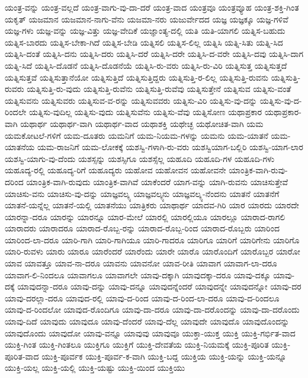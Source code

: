 {ಯಂತ್ರ-ವನ್ನು
ಯಂತ್ರ-ವಲ್ಲದೆ
ಯಂತ್ರ-ವಾಗು-ವು-ದಾ-ದರೆ
ಯಂತ್ರ-ವಾದ
ಯಂತ್ರವೂ
ಯಂತ್ರವ್ಯೂಹ
ಯಂತ್ರ-ಶಕ್ತಿ-ಗಿಂತ
ಯಕೃತ್
ಯಜಮಾನ
ಯಜಮಾನ-ನಾಗು-ವೆನು
ಯಜಮಾ-ನರು
ಯಜುರ್ವೇದದ
ಯಜ್ಞ
ಯಜ್ಞಕ್ಕೂ
ಯಜ್ಞ-ಗಳಿವೆ
ಯಜ್ಞ-ಗಳು
ಯಜ್ಞ-ವನ್ನು
ಯಜ್ಞ-ವಿತ್ತು
ಯಜ್ಞ-ವೇದಿಕೆ
ಯಜ್ಞಾಂತ್ಯ-ದಲ್ಲಿ
ಯತಿ
ಯತಿ-ಯಾಗಲಿ
ಯತ್ನಿಸ-ಬಹುದು
ಯತ್ನಿಸ-ಬಾರದು
ಯತ್ನಿಸ-ಬೇಕಾ-ಗಿದೆ
ಯತ್ನಿಸ-ಬೇಡಿ
ಯತ್ನಿಸಲಿ
ಯತ್ನಿಸ-ಲಿಲ್ಲ
ಯತ್ನಿಸಿ
ಯತ್ನಿ-ಸಿತು
ಯತ್ನಿ-ಸಿದ
ಯತ್ನಿಸಿ-ದಂತೆ
ಯತ್ನಿಸಿ-ದನು
ಯತ್ನಿಸಿ-ದರು
ಯತ್ನಿಸಿ-ದರೆ
ಯತ್ನಿಸಿ-ದರೇ
ಯತ್ನಿಸಿ-ದ-ವರೇ
ಯತ್ನಿಸಿ-ದವು
ಯತ್ನಿಸಿ-ದಾಗ
ಯತ್ನಿ-ಸಿದೆ
ಯತ್ನಿಸಿ-ದೊಡನೆ
ಯತ್ನಿಸಿ-ದೊಡನೆಯೆ
ಯತ್ನಿಸಿ-ರು-ವರು
ಯತ್ನಿಸಿ-ರು-ವಿರಿ
ಯತ್ನಿಸುತ್ತ
ಯತ್ನಿಸುತ್ತದೆ
ಯತ್ನಿಸುತ್ತವೆ
ಯತ್ನಿಸುತ್ತಾನೆಯೋ
ಯತ್ನಿಸುತ್ತಿದೆ
ಯತ್ನಿಸುತ್ತಿದ್ದರು
ಯತ್ನಿಸುತ್ತಿ-ರ-ಲಿಲ್ಲ
ಯತ್ನಿಸುತ್ತಿ-ರುವನು
ಯತ್ನಿಸುತ್ತಿ-ರುವರು
ಯತ್ನಿಸುತ್ತಿ-ರು-ವುದು
ಯತ್ನಿಸುತ್ತಿ-ರುವೆನು
ಯತ್ನಿಸುತ್ತಿ-ರುವೆವು
ಯತ್ನಿಸುತ್ತೇನೆ
ಯತ್ನಿಸುವ
ಯತ್ನಿಸು-ವಂತೆ
ಯತ್ನಿಸುವನು
ಯತ್ನಿಸುವರು
ಯತ್ನಿಸುವ-ವ-ರನ್ನು
ಯತ್ನಿಸುವವರು
ಯತ್ನಿಸು-ವಿರಿ
ಯತ್ನಿಸು-ವು-ದನ್ನು
ಯತ್ನಿಸು-ವು-ದ-ರಿಂದಲೇ
ಯತ್ನಿಸು-ವುದಿಲ್ಲ
ಯತ್ನಿಸು-ವುದು
ಯತ್ನಿಸುವೆನು
ಯತ್ನಿಸು-ವೆವು
ಯತ್ನಿಸೋಣ
ಯಥಾಪ್ರಕಾರ
ಯಥಾಪ್ರಕಾರ-ವಾಗಿ
ಯಥಾರ್ಥ
ಯಥಾರ್ಥ-ವಾಗಿ
ಯಥಾರ್ಥ-ವಾದ
ಯಥಾಶಕ್ತಿ
ಯಥೇಚ್ಛ
ಯಥೋಚಿತ-ವಾಗಿ
ಯಮ
ಯಮಕೋಟಲೆ-ಗಳಿಗೆ
ಯಮ-ದೂತರು
ಯಮನಿಗೆ
ಯಮ-ನಿಯಮ-ಗಳನ್ನು
ಯಮನು
ಯಮ-ಯಾತನೆ
ಯಮ-ಯಾತನೆಯ
ಯಮ-ರಾಜನಿಗೆ
ಯಮ-ಲೋಕಕ್ಕೆ
ಯಶಸ್ವಿ-ಗಳಾಗಿ-ರು-ವರು
ಯಶಸ್ವಿಯಾಗ-ಬಲ್ಲಿರಿ
ಯಶಸ್ವಿ-ಯಾಗ-ಲಾರ
ಯಶಸ್ವಿ-ಯಾಗು-ವು-ದೆಂದು
ಯಶಸ್ಸನ್ನು
ಯಶಸ್ಸಿಗೂ
ಯಶಸ್ಸೆಲ್ಲ
ಯಹೂದಿ
ಯಹೂದಿ-ಗಳ
ಯಹೂದಿ-ಗಳು
ಯಹೂದ್ಯ-ರಲ್ಲಿ
ಯಹೂದ್ಯ-ರಿಗೆ
ಯಹೂದ್ಯರು
ಯಹೋವ
ಯಹೋವನ
ಯಹೋವನೇ
ಯಾಂತ್ರಿಕ-ವಾಗಿ-ರುವು-ದರಿಂದ
ಯಾಂತ್ರಿಕ-ವಾಗಿ-ರುವುದು
ಯಾಂತ್ರಿಕ-ವಾಗಿವೆ
ಯಾಕೆಂದರೆ
ಯಾಗ-ವನ್ನು
ಯಾಗಿ-ರುವನು
ಯಾಚಿಸುತ್ತೇವೆ
ಯಾಚಿಸು-ವನು
ಯಾಚಿಸು-ವು-ದನ್ನು
ಯಾಜ್ಞವಲ್ಕ್ಯ
ಯಾಜ್ಞವಲ್ಕ್ಯನು
ಯಾಜ್ಞವಲ್ಕ್ಯ-ನೆಂದನು
ಯಾತನೆ
ಯಾತನೆಗೆ
ಯಾತನೆ-ಯನ್ನೆಲ್ಲ
ಯಾತನೆ-ಯಲ್ಲಿ
ಯಾತನೆಯು
ಯಾತ್ರಿಕರು
ಯಾಥಾರ್ಥ
ಯಾದವ-ಗಿರಿ
ಯಾರ
ಯಾರದು
ಯಾರದೇ
ಯಾರನ್ನಾ-ದರೂ
ಯಾರನ್ನು
ಯಾರನ್ನೂ
ಯಾರ-ಮೇಲೆ
ಯಾರಲ್ಲಿ
ಯಾರಲ್ಲಿಯೂ
ಯಾರಲ್ಲೂ
ಯಾರಾದ-ರಾಗಲಿ
ಯಾರಾದರು
ಯಾರಾದರೂ
ಯಾರಾದ-ರೊಬ್ಬ-ರನ್ನು
ಯಾರಾದ-ರೊಬ್ಬ-ರಿಂದ
ಯಾರಾದ-ರೊಬ್ಬರು
ಯಾರಿಂದ
ಯಾರಿಂದ-ಲಾ-ದರೂ
ಯಾರಿ-ಗಾಗಿ
ಯಾರಿ-ಗಾಗಿಯೂ
ಯಾರಿ-ಗಾದರೂ
ಯಾರಿಗೂ
ಯಾರಿಗೆ
ಯಾರಿಗೇನು
ಯಾರಿಗೊ
ಯಾರಿ-ರುವಳು
ಯಾರು
ಯಾರೂ
ಯಾರೆಂದರೆ
ಯಾರೆಂದು
ಯಾರೇ
ಯಾರೊ
ಯಾರೊಂದಿಗೆ
ಯಾರೊಬ್ಬರ
ಯಾರೋ
ಯಾವ
ಯಾವತ್ತೂ
ಯಾವ-ನಾ-ದರೂ
ಯಾವನು
ಯಾವನೋ
ಯಾವ-ರೀತಿ
ಯಾವಾಗ
ಯಾವಾಗ-ಲಾ-ದರೂ
ಯಾವಾಗ-ಲಿ-ನಿಂದಲೂ
ಯಾವಾಗಲೂ
ಯಾವಾಗಲೇ
ಯಾವು-ದಕ್ಕಾಗಿ
ಯಾವುದಕ್ಕಾ-ದರೂ
ಯಾವು-ದಕ್ಕೂ
ಯಾವು-ದಕ್ಕೆ
ಯಾವುದನ್ನಾ-ದರೂ
ಯಾವು-ದನ್ನು
ಯಾವು-ದನ್ನೂ
ಯಾವುದನ್ನೆಂದರೆ
ಯಾವುದನ್ನೇ
ಯಾವುದನ್ನೋ
ಯಾವು-ದರ
ಯಾವು-ದರಲ್ಲಾ-ದರೂ
ಯಾವುದ-ರಲ್ಲಿ
ಯಾವು-ದ-ರಿಂದ
ಯಾವು-ದ-ರಿಂದ-ಲಾ-ದರೂ
ಯಾವು-ದ-ರಿಂದಲೂ
ಯಾವು-ದ-ರಿಂದಲೋ
ಯಾವುದ-ರೊಂದಿಗೂ
ಯಾವು-ದಾ-ದರೂ
ಯಾವು-ದಾ-ದರೊಂದನ್ನು
ಯಾವು-ದಾ-ದರೊಂದು
ಯಾವು-ದಿದೆ
ಯಾವುದು
ಯಾವುದೂ
ಯಾವು-ದೆಂದರೆ
ಯಾವು-ದೆಲ್ಲ
ಯಾವುದೇ
ಯಾವುದೊ
ಯಾವುದೊಂದನ್ನು
ಯಾವುದೊಂದು
ಯಾವುದೋ
ಯಾವು-ವನ್ನೂ
ಯಾವುವು
ಯಾವುವೂ
ಯುಕ್ತಾ-ಯುಕ್ತ
ಯುಕ್ತಿ
ಯುಕ್ತಿ-ಗರ್ಭಿತ-ವಾದ
ಯುಕ್ತಿ-ಗಿಂತ
ಯುಕ್ತಿ-ಗಿಂತಲೂ
ಯುಕ್ತಿಗೂ
ಯುಕ್ತಿಗೆ
ಯುಕ್ತಿ-ದೇವತೆಯ
ಯುಕ್ತಿ-ನಿಯಮಕ್ಕೆ
ಯುಕ್ತಿ-ಪೂರಿತ
ಯುಕ್ತಿ-ಪೂರಿತ-ವಾದ
ಯುಕ್ತಿ-ಪೂರ್ವಕ
ಯುಕ್ತಿ-ಪೂರ್ವ-ಕ-ವಾಗಿ
ಯುಕ್ತಿ-ಬದ್ದ
ಯುಕ್ತಿಯ
ಯುಕ್ತಿ-ಯನ್ನು
ಯುಕ್ತಿ-ಯನ್ನೂ
ಯುಕ್ತಿ-ಯಲ್ಲ
ಯುಕ್ತಿ-ಯಲ್ಲಿ
ಯುಕ್ತಿ-ಯಷ್ಟು
ಯುಕ್ತಿ-ಯಿಂದ
ಯುಕ್ತಿಯು
}
